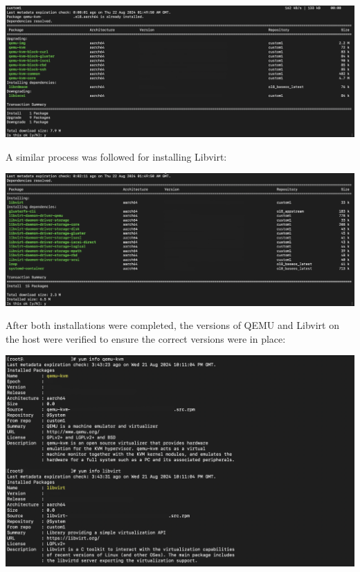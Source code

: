 \begin{center}
    \centering
    \includegraphics[width=\textwidth]{Images/QEMU-Installation.png}
    \label{fig:casa}
\end{center}

A similar process was followed for installing Libvirt:

\begin{center}
    \centering
    \includegraphics[width=\textwidth]{Images/Libvirt-Installation.png}
    \label{fig:casa}
\end{center}

After both installations were completed, the versions of QEMU and Libvirt on the host were verified to ensure the correct versions were in place:

\begin{center}
    \centering
    \includegraphics[width=\textwidth]{Images/QEMU & Libvirt Version.png}
    \label{fig:casa}
\end{center}


